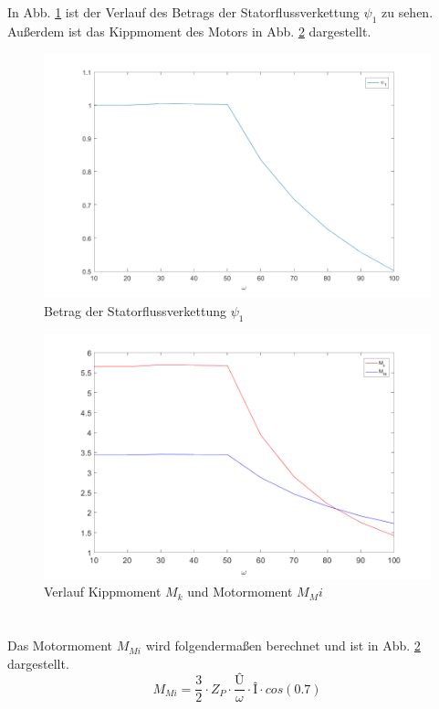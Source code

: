 \section{}\label{sec:aufg6b}
%
In Abb. \ref{fig:Statorflussverkettung} ist der Verlauf des Betrags der Statorflussverkettung $\psi_1$ zu sehen. Außerdem ist das Kippmoment des Motors in Abb. \ref{fig:momente} dargestellt.
\begin{figure}[htb]
	\includegraphics[width = \textwidth]{./Bilder/f_psi}
	\caption{Betrag der Statorflussverkettung $\psi_1$}
	\label{fig:Statorflussverkettung}
\end{figure}
%
\begin{figure}[htb]
	\includegraphics[width = \textwidth]{./Bilder/f_moment}
	\caption{Verlauf Kippmoment $M_k$ und Motormoment $M_Mi$}
	\label{fig:momente}
\end{figure}
\newpage
\section{}\label{sec:aufg6c}
%
Das Motormoment $M_{Mi}$ wird folgendermaßen berechnet und ist in Abb. \ref{fig:momente} dargestellt.
\begin{equation}
M_{Mi} = \frac{3}{2}\cdot Z_P \cdot \frac{\textit{\^{U}}}{\omega} \cdot \textit{\^{I}} \cdot cos(0.7)
\end{equation}